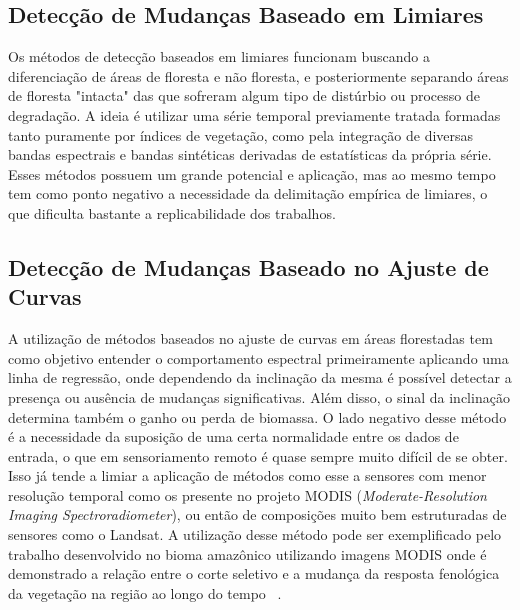\documentclass[twocolumn]{article}
\begin{document}
\subsection{Detecção de Mudanças Baseado em Limiares}
Os métodos de detecção baseados em limiares funcionam buscando a diferenciação de áreas de floresta e não floresta, e posteriormente separando áreas de floresta "intacta" das que sofreram algum tipo de distúrbio ou processo de degradação. A ideia é utilizar uma série temporal previamente tratada formadas tanto puramente por índices de vegetação, como pela integração de diversas bandas espectrais e bandas sintéticas derivadas de estatísticas da própria série. Esses métodos possuem um grande potencial e aplicação, mas ao mesmo tempo tem como ponto negativo a necessidade da delimitação empírica de limiares, o que dificulta bastante a replicabilidade dos trabalhos.

\subsection{Detecção de Mudanças Baseado no Ajuste de Curvas}
A utilização de métodos baseados no ajuste de curvas em áreas florestadas tem como objetivo entender o comportamento espectral primeiramente aplicando uma linha de regressão, onde dependendo da inclinação da mesma é possível detectar a presença ou ausência de mudanças significativas. Além disso, o sinal da inclinação determina também o ganho ou perda de biomassa. O lado negativo desse método é a necessidade da suposição de uma certa normalidade entre os dados de entrada, o que em sensoriamento remoto é quase sempre muito difícil de se obter. Isso já tende a limiar a aplicação de métodos como esse a sensores com menor resolução temporal como os presente no projeto MODIS (\textit{Moderate-Resolution Imaging Spectroradiometer}), ou então de composições muito bem estruturadas de sensores como o Landsat. A utilização desse método pode ser exemplificado pelo trabalho desenvolvido no bioma amazônico utilizando imagens MODIS onde é demonstrado a relação entre o corte seletivo e a mudança da resposta fenológica da vegetação na região ao longo do tempo ~\cite{KOLTUNOV20092431}.
\end{document}
